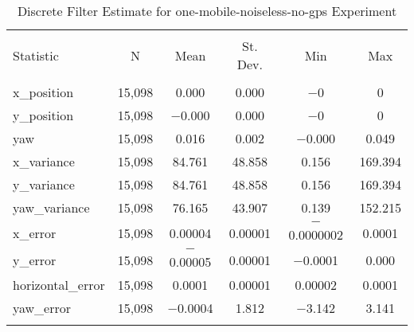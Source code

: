 
\begin{table}[h] \centering 
  \caption{Discrete Filter Estimate for one-mobile-noiseless-no-gps Experiment} 
  \label{tab:one_mobile_noiseless_no_gps_discrete_summary} 
\begin{tabular}{@{\extracolsep{5pt}}lccccc} 
\\[-1.8ex]\hline 
\hline \\[-1.8ex] 
Statistic & \multicolumn{1}{c}{N} & \multicolumn{1}{c}{Mean} & \multicolumn{1}{c}{St. Dev.} & \multicolumn{1}{c}{Min} & \multicolumn{1}{c}{Max} \\ 
\hline \\[-1.8ex] 
x\_position & 15,098 & \num{0.000} & \num{0.000} & $-$0 & 0 \\ 
y\_position & 15,098 & $-$0.000 & \num{0.000} & $-$0 & 0 \\ 
yaw & 15,098 & \num{0.016} & \num{0.002} & $-$0.000 & \num{0.049} \\ 
x\_variance & 15,098 & \num{84.761} & \num{48.858} & \num{0.156} & \num{169.394} \\ 
y\_variance & 15,098 & \num{84.761} & \num{48.858} & \num{0.156} & \num{169.394} \\ 
yaw\_variance & 15,098 & \num{76.165} & \num{43.907} & \num{0.139} & \num{152.215} \\ 
x\_error & 15,098 & \num{0.00004} & \num{0.00001} & $-$0.0000002 & \num{0.0001} \\ 
y\_error & 15,098 & $-$0.00005 & \num{0.00001} & $-$0.0001 & \num{0.000} \\ 
horizontal\_error & 15,098 & \num{0.0001} & \num{0.00001} & \num{0.00002} & \num{0.0001} \\ 
yaw\_error & 15,098 & $-$0.0004 & \num{1.812} & $-$3.142 & \num{3.141} \\ 
\hline \\[-1.8ex] 
\end{tabular} 
\end{table} 
